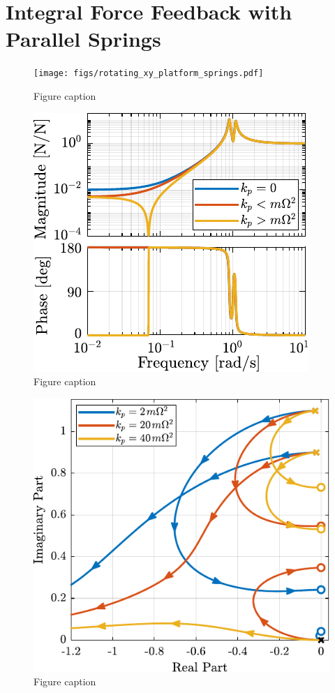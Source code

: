 \documentclass{ISMA_USD2020}
\begin{document}
\section{Integral Force Feedback with Parallel Springs}
\label{sec:orga4142a5}

\begin{figure}[htbp]
\centering
\texttt{[image: figs/rotating\_xy\_platform\_springs.pdf]}
\caption{\label{fig:rotating_xy_platform_springs}Figure caption}
\end{figure}

\begin{figure}[htbp]
\centering
\includegraphics[scale=1]{figs/plant_iff_kp.pdf}
\caption{\label{fig:plant_iff_kp}Figure caption}
\end{figure}

\begin{figure}[htbp]
\centering
\includegraphics[scale=1]{figs/root_locus_iff_kps.pdf}
\caption{\label{fig:root_locus_iff_kps}Figure caption}
\end{figure}
\end{document}
